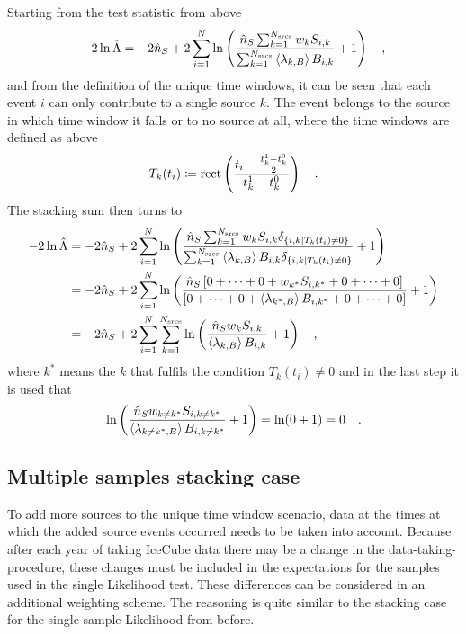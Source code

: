 Starting from the test statistic from above
\begin{equation}
  -2\ln\hat{\Lambda}
  = -2\hat{n}_S +
      2\sum_{i=1}^N \ln\left(
        \frac{\hat{n}_S \sum_{k=1}^{N_\text{srcs}} w_k S_{i,k}}
             {\sum_{k=1}^{N_\text{srcs}}\Braket{\lambda_{k,B}} B_{i,k}}
        + 1
      \right)
  \quad\text{,}
\end{equation}
and from the definition of the unique time windows, it can be seen that each event $i$ can only contribute to a single source $k$.
The event belongs to the source in which time window it falls or to no source at all, where the time windows are defined as above
\begin{equation}
  T_k(t_i) \coloneqq \operatorname{rect} \left(
    \frac{t_i - \frac{t_k^1-t_k^0}{2}} {t_k^1-t_k^0}
  \right)
  \quad\text{.}
\end{equation}
The stacking sum then turns to
\begin{align}
  -2\ln\hat{\Lambda}
  &= -2\hat{n}_S +
      2\sum_{i=1}^N \ln\left(
        \frac{\hat{n}_S \sum_{k=1}^{N_\text{srcs}} w_k S_{i,k}
              \delta_{\{i,k|T_k(t_i)\neq 0\}}}
             {\sum_{k=1}^{N_\text{srcs}}\Braket{\lambda_{k,B}} B_{i,k}
              \delta_{\{i,k|T_k(t_i)\neq 0\}}}
        + 1
      \right) \\
  &= -2\hat{n}_S +
      2\sum_{i=1}^N \ln\left(
        \frac{\hat{n}_S \left[0+\dots+0+ w_{k^*} S_{i,k^*} +0+\dots+0\right]}
             {\left[
              0+\dots+0+ \Braket{\lambda_{k^*,B}} B_{i,k^*} +0+\dots+0
              \right]}
        + 1
      \right) \\
  &= -2\hat{n}_S +
      2\sum_{i=1}^N \sum_{k=1}^{N_\text{srcs}} \ln\left(
        \frac{\hat{n}_S w_k S_{i,k}}{\Braket{\lambda_{k,B}} B_{i,k}}
        + 1
      \right)
  \quad\text{,}
\end{align}
where $k^*$ means the $k$ that fulfils the condition $T_k(t_i)\neq 0$ and in the last step it is used that
\begin{equation}
  \ln\left(
      \frac{\hat{n}_S w_{k\neq k^*} S_{i,k\neq k^*}}
           {\Braket{\lambda_{k\neq k^*,B}} B_{i,k\neq k^*}}
      + 1
    \right)
    = \ln(0 + 1) = 0
  \quad\text{.}
\end{equation}

\subsection{Multiple samples stacking case}
To add more sources to the unique time window scenario, data at the times at which the added source events occurred needs to be taken into account.
Because after each year of taking IceCube data there may be a change in the data-taking-procedure, these changes must be included in the expectations for the samples used in the single Likelihood test.
These differences can be considered in an additional weighting scheme.
The reasoning is quite similar to the stacking case for the single sample Likelihood from before.

